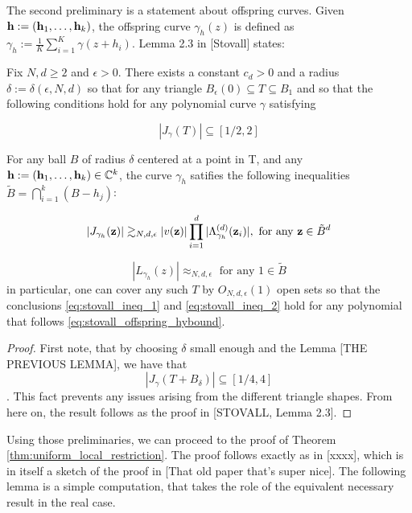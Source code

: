 	The second preliminary is a statement about offspring curves. Given ${\bf h}:= ({\bf h}_1, \dots, {\bf h}_k)$, the offspring curve $\gamma_h(z)$ is defined as $\gamma_h := \frac 1 K \sum_{i=1}^K \gamma(z+h_i)$. Lemma 2.3 in [Stovall] states:


	\begin{lemma}
	Fix $N,d \ge 2$ and $\epsilon>0$. There exists a constant $c_d > 0$ and a radius $\delta:=\delta(\epsilon,N,d)$ so that for any triangle $B_\epsilon(0) \subseteq T \subseteq B_1$ and so that the following conditions hold for any polynomial curve $\gamma$ satisfying 

	\begin{equation}
	\label{eq:stovall_offspring_hybound}
		|J_\gamma(T)|\subseteq [1/2, 2]
	\end{equation}

	For any ball $B$ of radius $\delta$ centered at a point in T, and any ${\bf h}:= ({\bf h}_1, \dots, {\bf h}_k) \in \mathbb C^k$, the curve $\gamma_h$ satifies the following inequalities $\tilde B = \bigcap_{i=1}^k (B - h_j)$:

	\begin{equation}
		\label{eq:stovall_ineq_1}
		|J_{\gamma_h}({\bf z})| \gtrsim_{N,d,\epsilon} |v( {\bf z})| \prod_{i=1}^d |\Lambda^{(d)}_{\gamma_h}( {\bf z}_i)|, \text{ for any }{\bf z} \in \tilde B^d
	\end{equation}

	\begin{equation}
		\label{eq:stovall_ineq_2}
		|L_{\gamma_h}(z)| \approx_{N,d,\epsilon} \text{ for any } 1 \in \tilde B
	\end{equation}
	in particular, one can cover any such $T$ by $O_{N,d,\epsilon}(1)$ open sets so that the conclusions \eqref{eq:stovall_ineq_1} and \eqref{eq:stovall_ineq_2} hold for any polynomial that follows \eqref{eq:stovall_offspring_hybound}.
	\end{lemma}

	\begin{proof}
		First note, that by choosing $\delta$ small enough and the Lemma [THE PREVIOUS LEMMA], we have that $$ |J_\gamma(T + B_\delta)|\subseteq [1/4, 4]$$. This fact prevents any issues arising from the different triangle shapes. From here on, the result follows as the proof in [STOVALL, Lemma 2.3].
	\end{proof}

	Using those preliminaries, we can proceed to the proof of Theorem \ref{thm:uniform_local_restriction}. The proof follows exactly as in [xxxx], which is in itself a sketch of the proof in [That old paper that's super nice]. The following lemma is a simple computation, that takes the role of the equivalent necessary result in the real case.

